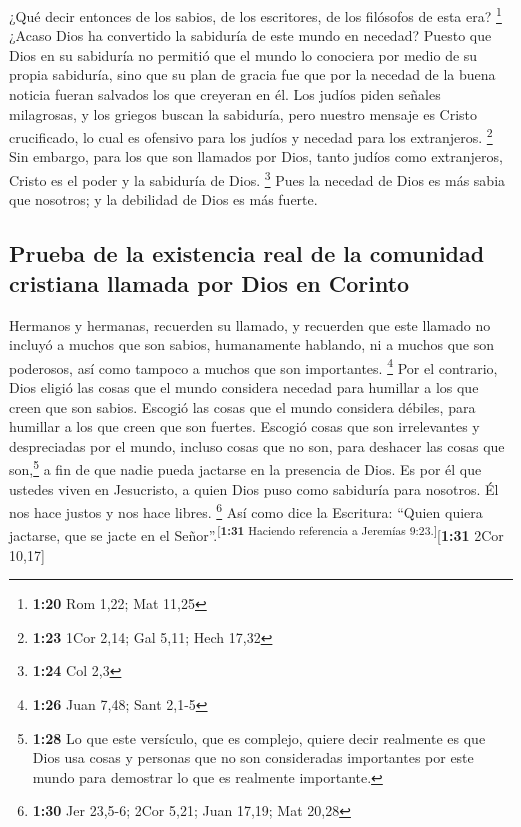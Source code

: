  ¿Qué decir entonces de los sabios, de los escritores, de
los filósofos de esta era? \footnote{\textbf{1:20} Rom 1,22; Mat 11,25}
 ¿Acaso Dios ha convertido la sabiduría de este mundo en
necedad? Puesto que Dios en su sabiduría no permitió que el mundo lo
conociera por medio de su propia sabiduría, sino que su plan de gracia
fue que por la necedad de la buena noticia fueran salvados los que
creyeran en él.  Los judíos piden señales milagrosas, y
los griegos buscan la sabiduría,  pero nuestro mensaje es
Cristo crucificado, lo cual es ofensivo para los judíos y necedad para
los extranjeros. \footnote{\textbf{1:23} 1Cor 2,14; Gal 5,11; Hech 17,32}
 Sin embargo, para los que son llamados por Dios, tanto
judíos como extranjeros, Cristo es el poder y la sabiduría de Dios.
\footnote{\textbf{1:24} Col 2,3}  Pues la necedad de Dios
es más sabia que nosotros; y la debilidad de Dios es más fuerte.

\hypertarget{prueba-de-la-existencia-real-de-la-comunidad-cristiana-llamada-por-dios-en-corinto}{%
\subsection{Prueba de la existencia real de la comunidad cristiana
llamada por Dios en
Corinto}\label{prueba-de-la-existencia-real-de-la-comunidad-cristiana-llamada-por-dios-en-corinto}}

 Hermanos y hermanas, recuerden su llamado, y recuerden
que este llamado no incluyó a muchos que son sabios, humanamente
hablando, ni a muchos que son poderosos, así como tampoco a muchos que
son importantes. \footnote{\textbf{1:26} Juan 7,48; Sant 2,1-5}
 Por el contrario, Dios eligió las cosas que el mundo
considera necedad para humillar a los que creen que son sabios. Escogió
las cosas que el mundo considera débiles, para humillar a los que creen
que son fuertes.  Escogió cosas que son irrelevantes y
despreciadas por el mundo, incluso cosas que no son, para deshacer las
cosas que son,\footnote{\textbf{1:28} Lo que este versículo, que es
  complejo, quiere decir realmente es que Dios usa cosas y personas que
  no son consideradas importantes por este mundo para demostrar lo que
  es realmente importante.}  a fin de que nadie pueda
jactarse en la presencia de Dios.  Es por él que ustedes
viven en Jesucristo, a quien Dios puso como sabiduría para nosotros. Él
nos hace justos y nos hace libres. \footnote{\textbf{1:30} Jer 23,5-6;
  2Cor 5,21; Juan 17,19; Mat 20,28}  Así como dice la
Escritura: ``Quien quiera jactarse, que se jacte en el
Señor''.\textsuperscript{{[}\textbf{1:31} Haciendo referencia a Jeremías
9:23.{]}}{[}\textbf{1:31} 2Cor 10,17{]}

